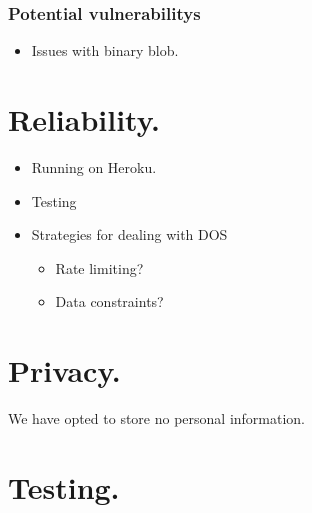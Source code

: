 \documentclass[10pt,a4paper]{article}
\begin{document}
\subsubsection*{Potential vulnerabilitys}
\begin{itemize}
  \item Issues with binary blob.
\end{itemize}


\newpage
\section*{Reliability.}
  \begin{itemize}
    \item Running on Heroku.
    \item Testing
    \item Strategies for dealing with DOS 
      \begin{itemize}
        \item Rate limiting?
        \item Data constraints?
      \end{itemize}
\end{itemize}


\newpage 
\section*{Privacy.}
We have opted to store no personal information.


\newpage
\section*{Testing.}

\end{document}
